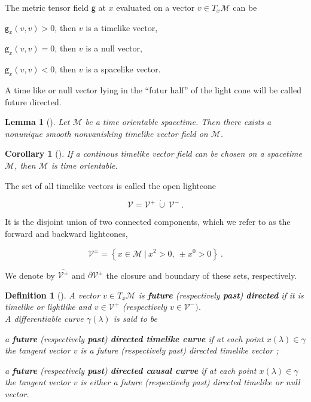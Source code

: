 \documentclass[11pt]{book}
\newcommand{\Mcal}{\mathcal{M}}
\newcommand{\Vcal}{\mathcal{V}}
\newcommand{\gsf}{\mathsf{g}}
\theoremstyle{break}
\newtheorem{lemma}{Lemma}
\newtheorem{corollary}{Corollary}
\newtheorem{definition}{Definition}
\begin{document}
The metric tensor field $\gsf$ at $x$ evaluated on a vector $v \in T_x\Mcal$ can be
\begin{description}
 \item $\gsf_x(v,v) > 0$, then $v$ is a timelike vector,
 \item $\gsf_x(v,v) = 0$, then $v$ is a null vector,
 \item $\gsf_x(v,v) < 0$, then $v$ is a spacelike vector.
\end{description}
A time like or null vector lying in the ``futur half'' of the light cone will be called future directed.

\begin{lemma}[]
Let $\Mcal$ be a time orientable spacetime. Then there exists a nonunique smooth nonvanishing timelike vector field on $\Mcal$.
\end{lemma}

\begin{corollary}[]
If a continous timelike vector field can be chosen on a spacetime $\Mcal$, then $\Mcal$ is time orientable.
\end{corollary}

The set of all timelike vectors is called the open lightcone 

\begin{equation*}
 \Vcal=\Vcal^{+} \ \dot{\cup} \ \Vcal^{-} \ . 
\end{equation*}

It is the disjoint union of two connected components, which we refer to as the forward and backward lightcones, 

\begin{equation*}
\Vcal^{\pm}=\left\{ x\in\Mcal \ | \ x^{2}>0, \ \pm x^{0}>0 \right\} \ . 
\end{equation*}

We denote by $\overline{\Vcal^{\pm}}$ and $\partial\Vcal^{\pm}$ the closure and boundary of these sets, respectively. \par

\begin{definition}[]
A vector $v \in T_x\Mcal$ is \textbf{future} (respectively \textbf{past}) \textbf{directed} if it is timelike or lightlike and $v \in \Vcal^+$ (respectively $v \in \Vcal^-)$. \\[3pt]
A differentiable curve $\gamma(\lambda)$ is said to be 

\begin{description}
\item a \textbf{future} (respectively \textbf{past}) \textbf{directed timelike curve} if at each point $x(\lambda) \in \gamma$ the tangent vector $v$ is a future (respectively past) directed timelike vector ;
\item a \textbf{future} (respectively \textbf{past}) \textbf{directed causal curve} if at each point $x(\lambda) \in \gamma$ the tangent vector $v$ is either a future (respectively past) directed timelike or null vector. 
\end{description} 

\end{definition}
\end{document}
